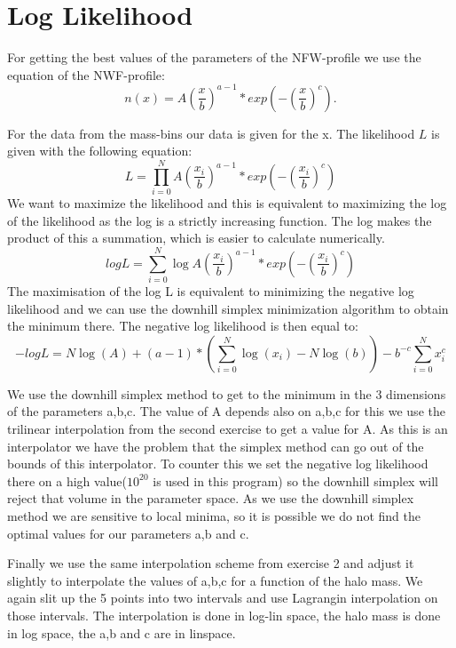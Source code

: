 \section{Log Likelihood}
For getting the best values of the parameters of the NFW-profile we use the equation of the NWF-profile:
\begin{equation}
n(x)=A \left(\frac{x}{b}\right)^{a-1}*exp\left(-(\frac{x}{b})^c\right).
\end{equation}

For the data from the mass-bins our data is given for the x.
The likelihood $L$ is given with the following equation:
\begin{equation}
L=\displaystyle\prod_{i=0}^N{A \left(\frac{x_i}{b}\right)^{a-1}*exp\left(-(\frac{x_i}{b})^c\right)}
\end{equation}
We want to maximize the likelihood and this is equivalent to maximizing the log of the likelihood as the log is a strictly increasing function.
The log makes the product of this a summation, which is easier to calculate numerically. 
\begin{equation}
log L=\displaystyle\sum_{i=0}^N{\log A \left(\frac{x_i}{b}\right)^{a-1}*exp\left(-(\frac{x_i}{b})^c\right)}
\end{equation}
The maximisation of the log L is equivalent to minimizing the negative log likelihood and we can use the downhill simplex minimization algorithm to obtain the minimum there.
The negative log likelihood is then equal to:
\begin{equation}
-log L=N\log(A)+(a-1)*\left(\displaystyle\sum_{i=0}^N{\log(x_i)} -N\log(b)\right)-b^{-c}\displaystyle\sum_{i=0}^N{x_i^{c}}
\end{equation}

We use the downhill simplex method to get to the minimum in the 3 dimensions of the parameters a,b,c. The value of A depends also on a,b,c for this we use the trilinear interpolation from the second exercise to get a value for A.
As this is an interpolator we have the problem that the simplex method can go out of the bounds of this interpolator. To counter this we set the negative log likelihood there on a high value($10^{20}$ is used in this program) so the downhill simplex will reject that volume in the parameter space.
As we use the downhill simplex method we are sensitive to local minima, so it is possible we do not find the optimal values for our parameters a,b and c. 

Finally we use the same interpolation scheme from exercise 2 and adjust it slightly to interpolate the values of a,b,c for a function of the halo mass. We again slit up the 5 points into two intervals and use Lagrangin interpolation on those intervals. The interpolation is done in log-lin space, the halo mass is done in log space, the a,b and c are in linspace.



